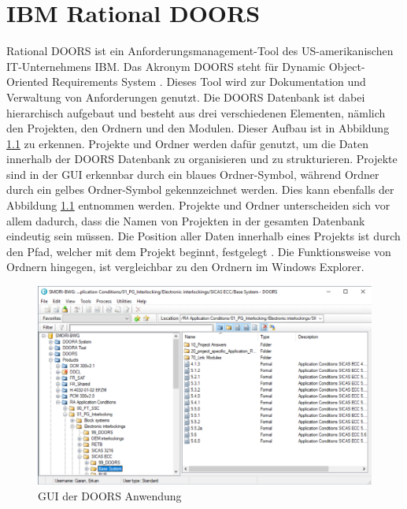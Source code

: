 \chapter{IBM Rational DOORS}
\label{chap:kapitel3}

Rational DOORS ist ein Anforderungsmanagement-Tool des US-amerikanischen IT-Unternehmens IBM. Das Akronym \acs{DOORS} steht für Dynamic Object-Oriented Requirements System \cite[]{q5}.
Dieses Tool wird zur Dokumentation und Verwaltung von Anforderungen genutzt. Die \acs{DOORS} Datenbank ist dabei hierarchisch aufgebaut und besteht aus drei verschiedenen Elementen, nämlich den 
Projekten, den Ordnern und den Modulen. Dieser Aufbau ist in Abbildung \ref*{fig:Doors GUI} zu erkennen. Projekte und Ordner werden dafür genutzt, um die Daten innerhalb der \acs{DOORS} Datenbank 
zu organisieren und zu strukturieren. Projekte sind in der GUI erkennbar durch ein blaues Ordner-Symbol, während Ordner durch ein gelbes Ordner-Symbol gekennzeichnet werden. Dies kann ebenfalls der 
Abbildung \ref*{fig:Doors GUI} entnommen werden. Projekte und Ordner unterscheiden sich vor allem dadurch, dass die Namen von Projekten in der gesamten Datenbank eindeutig sein müssen. 
Die Position aller Daten innerhalb eines Projekts ist durch den Pfad, welcher mit dem Projekt beginnt, festgelegt \cite[]{q6}. Die Funktionsweise von Ordnern hingegen, ist vergleichbar 
zu den Ordnern im Windows Explorer.     

\begin{figure}[H]
    \centering
    \includegraphics[width = \textwidth]{abbildungen/IBM Doors.PNG}
    \caption{GUI der \acs{DOORS} Anwendung}
    \label{fig:Doors GUI}
\end{figure}

